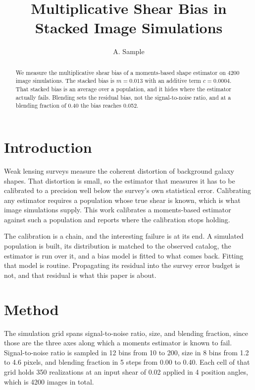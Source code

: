 \documentclass{article}
\newcommand{\Nsims}{4200}
\newcommand{\mbias}{0.013}
\newcommand{\cbias}{0.0004}
\begin{document}
\title{Multiplicative Shear Bias in Stacked Image Simulations}
\author{A. Sample}
\maketitle

\begin{abstract}
We measure the multiplicative shear bias of a moments-based shape estimator on
\Nsims{} image simulations. The stacked bias is $m = \mbias$ with an additive
term $c = \cbias$. That stacked bias is an average over a population, and it
hides where the estimator actually fails. Blending sets the residual bias, not
the signal-to-noise ratio, and at a blending fraction of 0.40 the bias reaches
0.052.
\end{abstract}

\section{Introduction}

Weak lensing surveys measure the coherent distortion of background galaxy
shapes. That distortion is small, so the estimator that measures it has to be
calibrated to a precision well below the survey's own statistical error.
Calibrating any estimator requires a population whose true shear is known,
which is what image simulations supply. This work calibrates a moments-based
estimator against such a population and reports where the calibration stops
holding.

The calibration is a chain, and the interesting failure is at its end. A
simulated population is built, its distribution is matched to the observed
catalog, the estimator is run over it, and a bias model is fitted to what comes
back. Fitting that model is routine. Propagating its residual into the survey
error budget is not, and that residual is what this paper is about.

\section{Method}

The simulation grid spans signal-to-noise ratio, size, and blending fraction,
since those are the three axes along which a moments estimator is known to
fail. Signal-to-noise ratio is sampled in 12 bins from 10 to 200, size in 8
bins from 1.2 to 4.6 pixels, and blending fraction in 5 steps from 0.00 to
0.40. Each cell of that grid holds 350 realizations at an input shear of 0.02
applied in 4 position angles, which is \Nsims{} images in total.
\end{document}
